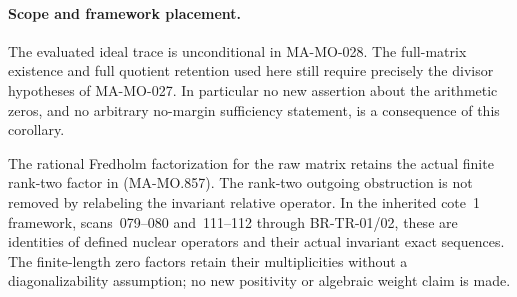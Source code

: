 \paragraph{Scope and framework placement.}
The evaluated ideal trace is unconditional
in MA-MO-028. The full-matrix existence and
full quotient retention used here still
require precisely the divisor hypotheses
of MA-MO-027. In particular no new assertion
about the arithmetic zeros, and no
arbitrary no-margin sufficiency statement,
is a consequence of this corollary.

The rational Fredholm factorization for
the raw matrix retains the actual finite
rank-two factor in (MA-MO.857). The
rank-two outgoing obstruction is not
removed by relabeling the invariant
relative operator. In the inherited cote~1
framework, scans~079--080 and~111--112
through BR-TR-01/02, these are identities
of defined nuclear operators and their
actual invariant exact sequences. The
finite-length zero factors retain their
multiplicities without a diagonalizability
assumption; no new positivity or algebraic
weight claim is made.

